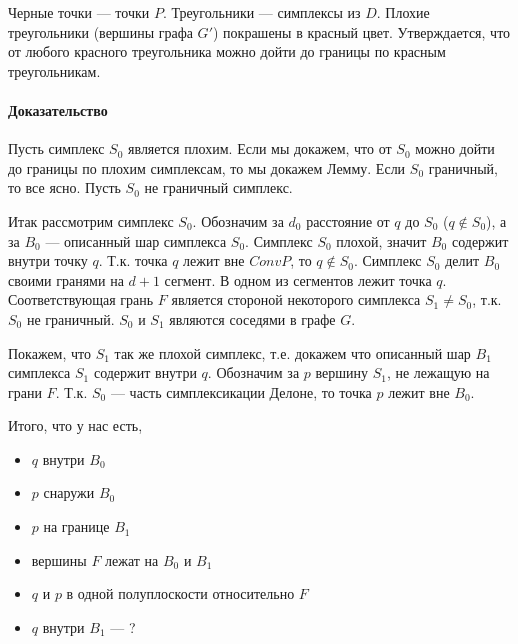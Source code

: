 \documentclass{article}
\begin{document}
        Черные точки --- точки $P$. Треугольники --- симплексы из $D$. Плохие треугольники (вершины графа $G'$) покрашены в красный цвет. Утверждается, что от любого красного треугольника можно дойти до границы по красным треугольникам.
        
    \paragraph{Доказательство\\}
        Пусть симплекс $S_0$ является плохим. Если мы докажем, что от $S_0$ можно дойти до границы по плохим симплексам, то мы докажем Лемму. Если $S_0$ граничный, то все ясно. Пусть $S_0$ не граничный симплекс. 
        
        Итак рассмотрим симплекс $S_0$. Обозначим за $d_0$ расстояние от $q$ до $S_0$ ($q \notin S_0$), а за $B_0$ --- описанный шар симплекса $S_0$. Симплекс $S_0$ плохой, значит $B_0$ содержит внутри точку $q$. Т.к. точка $q$ лежит вне $Conv P$, то $q \notin S_0$. Симплекс $S_0$ делит $B_0$ своими гранями на $d + 1$ сегмент. В одном из сегментов лежит точка $q$. Соответствующая грань $F$ является стороной некоторого симплекса $S_1 \neq S_0$, т.к. $S_0$ не граничный. $S_0$ и $S_1$ являются соседями в графе $G$. 
        
        Покажем, что $S_1$ так же плохой симплекс, т.е. докажем что описанный шар $B_1$ симплекса $S_1$ содержит внутри $q$. Обозначим за $p$ вершину $S_1$, не лежащую на грани $F$. Т.к. $S_0$ --- часть симплексикации Делоне, то точка $p$ лежит вне $B_0$.
        
        Итого, что у нас есть,
        \begin{itemize}
            \item $q$ внутри $B_0$
            \item $p$ снаружи $B_0$
            \item $p$ на границе $B_1$
            \item вершины $F$ лежат на $B_0$ и $B_1$
            \item $q$ и $p$ в одной полуплоскости относительно $F$ 
            \item $q$ внутри $B_1$ --- ?
        \end{itemize}
\end{document}
